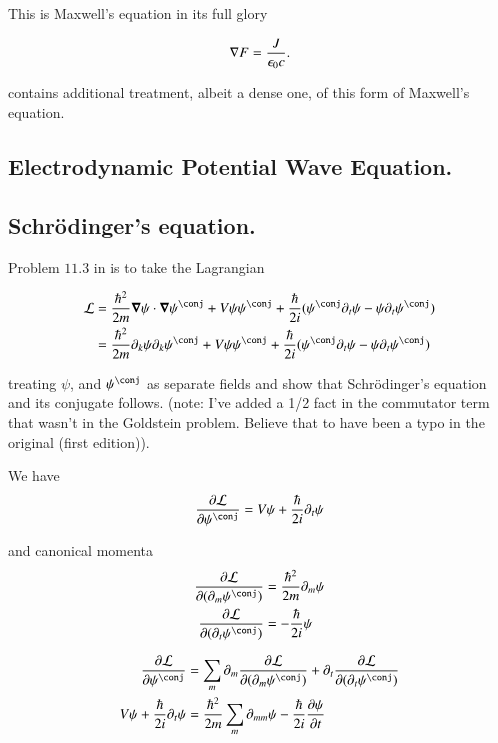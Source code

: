 \documentclass{article}
\begin{document}
This is Maxwell's equation in its full glory

\begin{align}
\nabla F = \frac{J}{\epsilon_0 c}.
\end{align}

\cite{doran2003gap} contains additional treatment, albeit a dense one, of 
this form of Maxwell's equation.

\subsection{ Electrodynamic Potential Wave Equation. }

\subsection{ Schr\"{o}dinger's equation. }

Problem $11.3$ in \cite{goldstein1951cm} is to take the Lagrangian

\begin{align*}
\LL 
&= \frac{\hbar^2}{2 m} \spacegrad \psi \cdot \spacegrad \psi^\conj + V \psi \psi^\conj + \frac{\hbar}{2i} ( \psi^\conj \partial_t \psi - \psi \partial_t \psi^\conj ) \\
&= \frac{\hbar^2}{2 m} \partial_k \psi \partial_k \psi^\conj + V \psi \psi^\conj + 
\frac{\hbar}{2i} ( \psi^\conj \partial_t \psi - \psi \partial_t \psi^\conj ) \\
\end{align*}

treating $\psi$, and $\psi^\conj$ as separate fields and show that Schr\"{o}dinger's equation and its conjugate follows.  (note: I've added a 1/2 fact in the
commutator term that wasn't in the Goldstein problem.  Believe that to have been a typo in the original (first edition)).

We have
\begin{align*}
\PD{\psi^\conj}{\LL} &= V\psi + \frac{\hbar}{2i} \partial_t \psi \\
\end{align*}

and canonical momenta
\begin{align*}
\PD{(\partial_m \psi^\conj)}{\LL} &= \frac{\hbar^2}{2 m} \partial_{m} \psi \\
\PD{(\partial_t \psi^\conj)}{\LL} &= -\frac{\hbar}{2i} {\psi} \\
\end{align*}

\begin{align*}
\PD{\psi^\conj}{\LL} &= \sum_m \partial_m \PD{(\partial_m \psi^\conj)}{\LL} + \partial_t \PD{(\partial_t \psi^\conj)}{\LL} \\
V\psi + \frac{\hbar}{2i} \partial_t \psi &= \frac{\hbar^2}{2 m} \sum_m \partial_{mm} \psi -\frac{\hbar}{2i} \PD{t}{\psi} \\
\end{align*}
\end{document}
